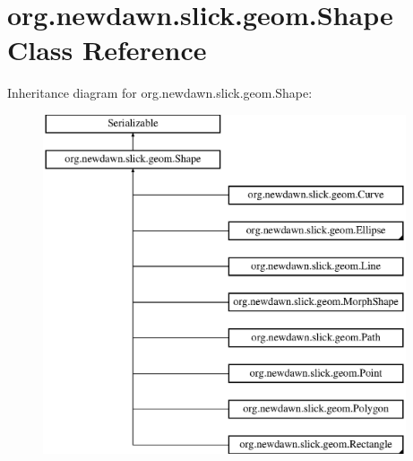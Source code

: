 \hypertarget{classorg_1_1newdawn_1_1slick_1_1geom_1_1_shape}{}\section{org.\+newdawn.\+slick.\+geom.\+Shape Class Reference}
\label{classorg_1_1newdawn_1_1slick_1_1geom_1_1_shape}
Inheritance diagram for org.\+newdawn.\+slick.\+geom.\+Shape\+:\begin{figure}[H]
\begin{center}
\leavevmode
\includegraphics[height=10.000000cm]{classorg_1_1newdawn_1_1slick_1_1geom_1_1_shape}
\end{center}
\end{figure}
